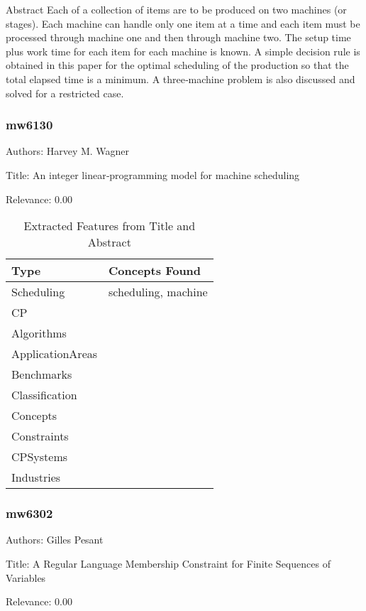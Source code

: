  Abstract  Each of a collection of items are to be produced on two machines (or stages). Each machine can handle only one item at a time and each item must be processed through machine one and then through machine two. The setup time plus work time for each item for each machine is known. A simple decision rule is obtained in this paper for the optimal scheduling of the production so that the total elapsed time is a minimum. A three‐machine problem is also discussed and solved for a restricted case. 

\subsubsection{mw6130}
\label{mw:mw6130}

Authors: Harvey M. Wagner

Title: An integer linear‐programming model for machine scheduling

Relevance:  0.00

{\scriptsize
\begin{longtable}{p{2cm}p{20cm}}
\caption{Extracted Features from Title and Abstract}\\ \toprule
Type & Concepts Found\\ \midrule
\endhead
\bottomrule
\endfoot
Scheduling & scheduling, machine\\ 
CP & \\ 
Algorithms & \\ 
ApplicationAreas & \\ 
Benchmarks & \\ 
Classification & \\ 
Concepts & \\ 
Constraints & \\ 
CPSystems & \\ 
Industries & \\ 
\end{longtable}
}



\subsubsection{mw6302}
\label{mw:mw6302}

Authors: Gilles Pesant

Title: A Regular Language Membership Constraint for Finite Sequences of Variables

Relevance:  0.00

